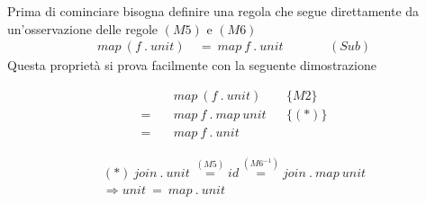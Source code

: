 Prima di cominciare bisogna definire una regola che segue direttamente da
un'osservazione delle regole $(M5)$ e $(M6)$
\begin{align*}
    map\ (f\ .\ unit)\ &=\ map\ f\ .\ unit \qquad&& (Sub)
  \end{align*}
Questa proprietà si prova facilmente con la seguente dimostrazione
\begin{framed}
\begin{align*}
    &\quad map\ (f\ .\ unit)\ && \{M2\}\\
    =&\quad map\ f\ .\ map\ unit &&\{(*)\}\\
    =&\quad map\ f\ .\ unit
\end{align*}

\begin{align*}
    (*)\ join\ .\ unit\ \stackrel{(M5)}{=} id \stackrel{(M6^{-1})}{=} join\ .\ map\ unit\\
    \Rightarrow unit\ =\ map\ .\ unit
\end{align*}



\end{framed}
